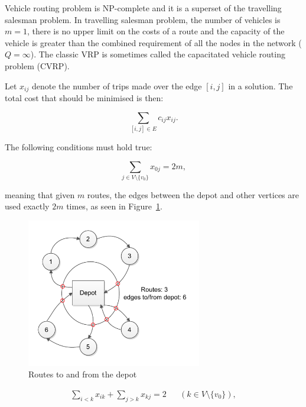 Vehicle routing problem is NP-complete and it is a superset of the travelling salesman problem. In travelling salesman problem, the number of vehicles is $m = 1$, there is no upper limit on the costs of a route and the capacity of the vehicle is greater than the combined requirement of all the nodes in the network ($Q = \infty$). \cite{laporte2007you} The classic VRP is sometimes called the capacitated vehicle routing problem (CVRP). \cite{hassanzadeh2009location}

Let $x_{ij}$ denote the number of trips made over the edge $[i, j]$ in a solution. The total cost that should be minimised is then:

\begin{equation}
\label{eq:baseformula1}
\displaystyle \sum_{[i,j] \in E} c_{ij}x_{ij}.
\end{equation}

\noindent
The following conditions must hold true:

\begin{equation}
\label{eq:baseformula2}
\displaystyle \sum_{j \in V \setminus\{v_0\}} x_{0j} = 2m,
\end{equation}

\noindent
meaning that given $m$ routes, the edges between the depot and other vertices are used exactly $2m$ times, as seen in Figure~\ref{fig:basecond1}. \cite{laporte2007you}
\begin{figure}[H]
  \begin{center}
    \includegraphics[height=6.5cm,keepaspectratio]{images/basecond1.pdf}
    \caption{Routes to and from the depot}
    \label{fig:basecond1}
  \end{center}
\end{figure}

\begin{equation}
\begin{aligned}
\label{eq:baseformula3}
\displaystyle\sum_{i < k} x_{ik} + \displaystyle\sum_{j > k} x_{kj} = 2 && (k \in V \setminus\{v_0\}),
\end{aligned}
\end{equation}

